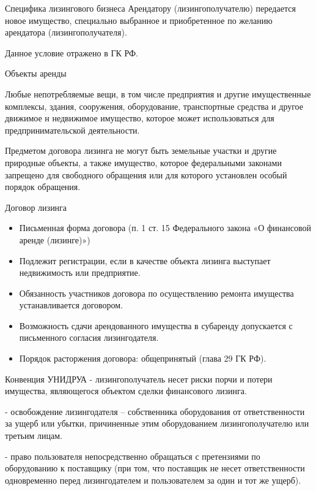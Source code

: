 \documentclass[_Banking_p3.tex]{subfiles}
\begin{document}
\begin{frame}{Специфика лизингового бизнеса }
Арендатору (лизингополучателю) передается новое имущество, специально выбранное и приобретенное по желанию арендатора (лизингополучателя). 

Данное условие отражено в ГК РФ.
\end{frame}

\begin{frame}[allowframebreaks]{Объекты аренды}

Любые непотребляемые вещи, в том числе предприятия и другие имущественные комплексы, здания, сооружения, оборудование, транспортные средства и другое движимое н недвижимое имущество, которое может использоваться для предпринимательской деятельности. 

\pagebreak
Предметом договора лизинга не могут быть земельные участки и другие природные объекты, а также имущество, которое федеральными законами запрещено для свободного обращения или для которого установлен особый порядок обращения.
\end{frame}

\begin{frame}[allowframebreaks]{Договор лизинга}
\begin{itemize}
\item
Письменная форма договора (п. 1 ст. 15 Федерального закона «О финансовой аренде (лизинге)»)

\item
Подлежит регистрации, если в качестве объекта лизинга выступает недвижимость или предприятие.

\pagebreak
\item
Обязанность участников договора по осуществлению ремонта имущества устанавливается договором.

\item
Возможность сдачи арендованного имущества в субаренду допускается с письменного согласия лизингодателя. 

\item
Порядок расторжения договора: общепринятый (глава 29 ГК РФ).
\end{itemize}
\end{frame}

\begin{frame}[allowframebreaks]{Конвенция УНИДРУА}
- лизингополучатель несет риски порчи и потери имущества, являющегося объектом сделки финансового лизинга.

- освобождение лизингодателя – собственника оборудования от ответственности за ущерб или убытки, причиненные этим оборудованием лизингополучателю или третьим лицам. 

\pagebreak
- право пользователя непосредственно обращаться с претензиями по оборудованию к поставщику (при том, что поставщик не несет ответственности одновременно перед лизингодателем и пользователем за один и тот же ущерб).

\end{frame}
\end{document}
